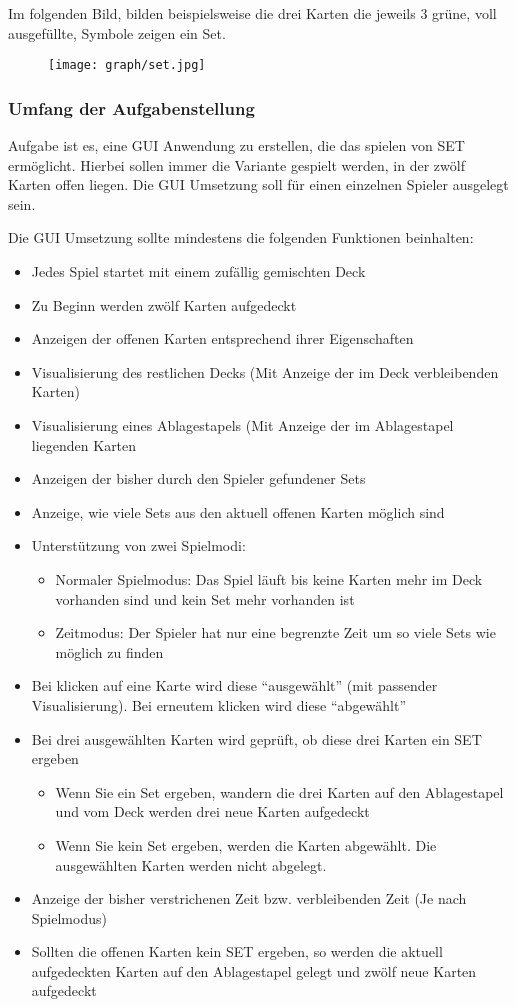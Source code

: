 \documentclass[a4paper,
			   fontsize=12pt]{article}
\begin{document}
Im folgenden Bild, bilden beispielsweise die drei Karten die jeweils 3 grüne, voll ausgefüllte, Symbole zeigen ein Set.
\begin{figure}[ht!]
	\texttt{[image: graph/set.jpg]}
\end{figure}

\subsubsection*{Umfang der Aufgabenstellung}
Aufgabe ist es, eine GUI Anwendung zu erstellen, die das spielen von SET ermöglicht. Hierbei sollen immer die Variante gespielt werden, in der zwölf Karten offen liegen.
Die GUI Umsetzung soll für einen einzelnen Spieler ausgelegt sein.

Die GUI Umsetzung sollte mindestens die folgenden Funktionen beinhalten:
\begin{itemize}
	\item Jedes Spiel startet mit einem zufällig gemischten Deck
	\item Zu Beginn werden zwölf Karten aufgedeckt
	\item Anzeigen der offenen Karten entsprechend ihrer Eigenschaften
	\item Visualisierung des restlichen Decks (Mit Anzeige der im Deck verbleibenden Karten)
	\item Visualisierung eines Ablagestapels (Mit Anzeige der im Ablagestapel liegenden Karten
	\item Anzeigen der bisher durch den Spieler gefundener Sets
	\item Anzeige, wie viele Sets aus den aktuell offenen Karten möglich sind
	\item Unterstützung von zwei Spielmodi:
	\begin{itemize}
		\item Normaler Spielmodus: Das Spiel läuft bis keine Karten mehr im Deck vorhanden sind und kein Set mehr vorhanden ist
		\item Zeitmodus: Der Spieler hat nur eine begrenzte Zeit um so viele Sets wie möglich zu finden
	\end{itemize}
	\item Bei klicken auf eine Karte wird diese "`ausgewählt"' (mit passender Visualisierung). Bei erneutem klicken wird diese "`abgewählt"'
	\item Bei drei ausgewählten Karten wird geprüft, ob diese drei Karten ein SET ergeben
	\begin{itemize}
		\item Wenn Sie ein Set ergeben, wandern die drei Karten auf den Ablagestapel und vom Deck werden drei neue Karten aufgedeckt
		\item Wenn Sie kein Set ergeben, werden die Karten abgewählt. Die ausgewählten Karten werden nicht abgelegt.
	\end{itemize}
	\item Anzeige der bisher verstrichenen Zeit bzw. verbleibenden Zeit (Je nach Spielmodus)
	\item Sollten die offenen Karten kein SET ergeben, so werden die aktuell aufgedeckten Karten auf den Ablagestapel gelegt und zwölf neue Karten aufgedeckt
\end{itemize}
\end{document}
